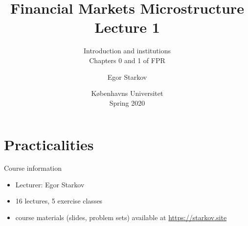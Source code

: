 \documentclass[english,10pt
,aspectratio=169
]{beamer}
\title{Financial Markets Microstructure \\ Lecture 1}
\subtitle{Introduction and institutions \\
Chapters 0 and 1 of FPR}
\author{Egor Starkov}
\date{K{\o}benhavns Universitet \\
	Spring 2020}
\begin{document}
\frame[plain]{\titlepage}
\addtocounter{framenumber}{-1}



\section{Practicalities}



%
%




\begin{frame}{Course information}
	\begin{itemize}
		\item Lecturer: Egor Starkov
		\item 16 lectures, 5 exercise classes
		\item course materials (slides, problem sets) available at \url{https://starkov.site}
	\end{itemize}
\end{frame}
\end{document}
